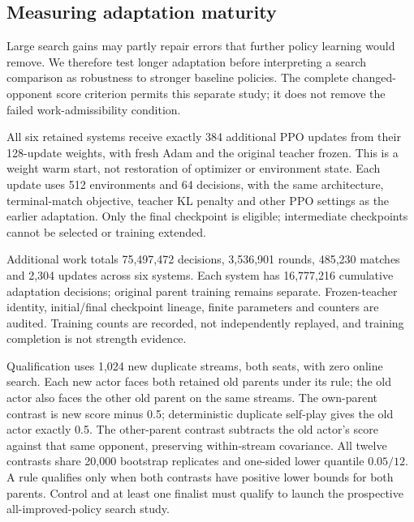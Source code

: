 \FloatBarrier
\subsection{Measuring adaptation maturity}
\label{app:public-stock-adaptation}
Large search gains may partly repair errors that further policy learning
would remove. We therefore test longer adaptation before interpreting a
search comparison as robustness to stronger baseline policies. The complete
changed-opponent score criterion permits this separate study; it does not
remove the failed work-admissibility condition.

All six retained systems receive exactly 384 additional PPO updates from
their 128-update weights, with fresh Adam and the original teacher frozen.
This is a weight warm start, not restoration of optimizer or environment
state. Each update uses 512 environments and 64 decisions, with the same
architecture, terminal-match objective, teacher KL penalty and other PPO
settings as the earlier adaptation. Only the final checkpoint is eligible;
intermediate checkpoints cannot be selected or training extended.

Additional work totals 75,497,472 decisions, 3,536,901 rounds, 485,230 matches
and 2,304 updates across six systems. Each system has 16,777,216 cumulative
adaptation decisions; original parent training remains separate. Frozen-teacher
identity, initial/final checkpoint lineage, finite parameters and counters
are audited. Training counts are recorded, not independently replayed, and
training completion is not strength evidence.

Qualification uses 1,024 new duplicate streams, both seats, with zero online
search. Each new actor faces both retained old parents under its rule; the
old actor also faces the other old parent on the same streams. The own-parent
contrast is new score minus 0.5; deterministic duplicate self-play gives the
old actor exactly 0.5. The other-parent contrast subtracts the old actor's
score against that same opponent, preserving within-stream covariance.
All twelve contrasts share 20,000 bootstrap replicates and one-sided lower
quantile $0.05/12$. A rule qualifies only when both contrasts have positive
lower bounds for both parents. Control and at least one finalist must qualify
to launch the prospective all-improved-policy search study.

\begin{table}[ht]
\centering\small

\caption{All zero-search qualification scores, with ties worth one half.
``Own'' and ``other'' always identify retained old opponents. The old actor
against itself has duplicate score 50\%; the old/other column is measured
on the same streams as new/other.}
\label{tab:public-stock-adaptation-scores}
\end{table}

